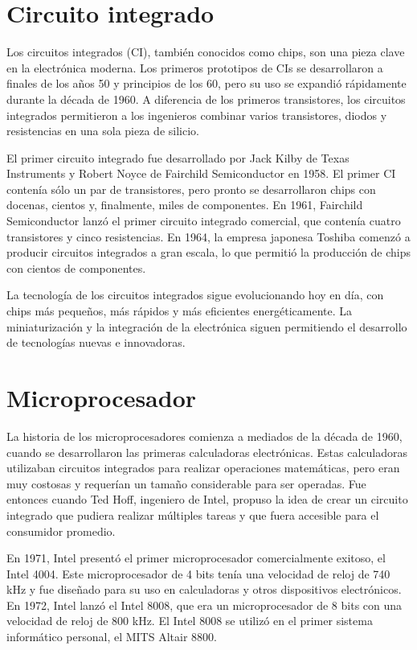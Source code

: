 \documentclass{article}
\begin{document}
\section*{Circuito integrado}

Los circuitos integrados (CI), también conocidos como chips, son una pieza clave en la electrónica moderna. 
Los primeros prototipos de CIs se desarrollaron a finales de los años 50 y principios de los 60, 
pero su uso se expandió rápidamente durante la década de 1960. A diferencia de los primeros transistores, 
los circuitos integrados permitieron a los ingenieros combinar varios transistores, diodos y resistencias 
en una sola pieza de silicio.

El primer circuito integrado fue desarrollado por Jack Kilby de Texas Instruments 
y Robert Noyce de Fairchild Semiconductor en 1958. El primer CI contenía sólo un par de transistores, 
pero pronto se desarrollaron chips con docenas, cientos y, finalmente, miles de componentes. 
En 1961, Fairchild Semiconductor lanzó el primer circuito integrado comercial, que contenía 
cuatro transistores y cinco resistencias. En 1964, la empresa japonesa Toshiba comenzó a 
producir circuitos integrados a gran escala, lo que permitió la producción de chips con 
cientos de componentes.

La tecnología de los circuitos integrados sigue evolucionando hoy en día, con chips más pequeños, más rápidos 
y más eficientes energéticamente. La miniaturización y la integración de la electrónica siguen permitiendo 
el desarrollo de tecnologías nuevas e innovadoras.

\section*{Microprocesador}

La historia de los microprocesadores comienza a mediados de la década de 1960, cuando se desarrollaron 
las primeras calculadoras electrónicas. Estas calculadoras utilizaban circuitos integrados 
para realizar operaciones matemáticas, pero eran muy costosas y requerían un tamaño considerable para ser operadas. 
Fue entonces cuando Ted Hoff, ingeniero de Intel, propuso la idea de crear un circuito integrado 
que pudiera realizar múltiples tareas y que fuera accesible para el consumidor promedio.

En 1971, Intel presentó el primer microprocesador comercialmente exitoso, el Intel 4004. 
Este microprocesador de 4 bits tenía una velocidad de reloj de 740 kHz y fue diseñado para su uso en calculadoras 
y otros dispositivos electrónicos. En 1972, Intel lanzó el Intel 8008, que era un microprocesador de 8 bits 
con una velocidad de reloj de 800 kHz. El Intel 8008 se utilizó en el primer sistema informático personal, 
el MITS Altair 8800.
\end{document}
